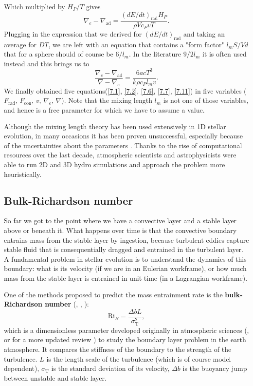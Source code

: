 Which multiplied by $H_P/T$ gives
\begin{equation}
\nabla_e - \nabla_{\mathrm{ad}} =  \frac{\left( dE/dt \right)_{ \mathrm{rad} } H_P}{\rho V c_P v T}.
\end{equation}
Plugging in the expression that we derived for $(dE/dt)_{\mathrm{rad}}$ and taking an average for $DT$, we are left with an equation that contains a "form factor" $l_m S/Vd$ that for a sphere should of course be $6/l_m$. In the literature $9/2l_m$ it is often used instead and this brings us to
\begin{equation}\label{7.11}
\frac{\nabla_e - \nabla_{\mathrm{ad}}}{\nabla - \nabla_e} = \frac{6acT^3}{k \rho c_P l_m v}.
\end{equation}
We finally obtained five equations(\ref{7.1}, \ref{7.2}, \ref{7.6}, \ref{7.7}, \ref{7.11}) in five variables ($F_{\mathrm{rad}}$, $F_{\mathrm{con}}$, $v$, $\nabla_e$, $\nabla$). Note that the mixing length $l_m$ is not one of those variables, and hence is a free parameter for which we have to assume a value. 

Although the mixing length theory has been used extensively in 1D stellar evolution, in many occasions it has been proven unsuccessful, especially because of the uncertainties about the parameters \citet{viallet2015}. Thanks to the rise of computational resources over the last decade, atmospheric scientists and astrophysicists were able to run 2D and 3D hydro simulations and approach the problem more heuristically.


\subsection{Bulk-Richardson number}

So far we got to the point where we have a convective layer and a stable layer above or beneath it. What happens over time is that the convective boundary entrains mass from the stable layer by ingestion, because turbulent eddies capture stable fluid that is consequentially dragged and entrained in the turbulent layer. A fundamental problem in stellar evolution is to understand the dynamics of this boundary: what is its velocity (if we are in an Eulerian workframe), or how much mass from the stable layer is entrained in unit time (in a Lagrangian workframe).

One of the methods proposed to predict the mass entrainment rate is the \textbf{bulk-Richardson number} (\citet{meakin}, \citet{viallet2015}, \citet{cristini}):
\begin{equation}\label{bulkrichardson}
	\mathrm{Ri}_{B}=\frac{\Delta b L}{\sigma_{\mathrm{T}}^2},
\end{equation}
which is a dimensionless parameter developed originally in atmospheric sciences (\citet{richardson}, or for a more updated review \citet{stull}) to study the boundary layer problem in the earth atmosphere. It compares the stiffness of the boundary to the strength of the turbulence. $L$ is the length scale of the turbulence (which is of course model dependent), $\sigma_{\mathrm{T}}$ is the standard deviation of its velocity, $\Delta b$ is the buoyancy jump between unstable and stable layer.

